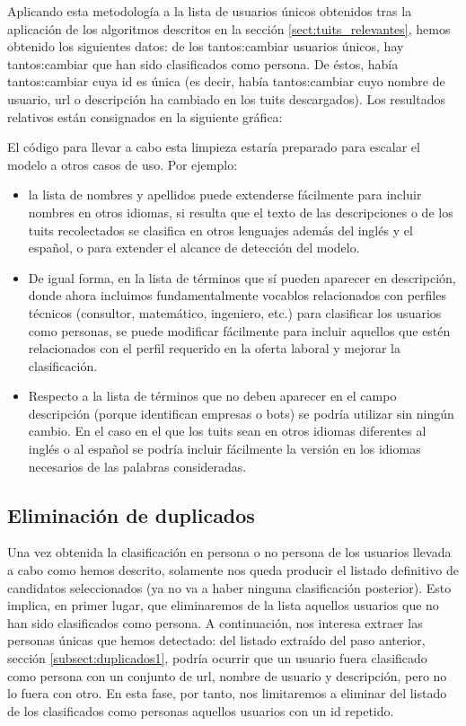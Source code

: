 Aplicando esta metodología a la lista de usuarios únicos obtenidos tras la aplicación
de los algoritmos descritos en la sección \ref{sect:tuits_relevantes}, 
hemos obtenido los siguientes datos: de los tantos:cambiar usuarios únicos, 
hay tantos:cambiar que han sido clasificados como persona. De éstos, había tantos:cambiar
cuya id es única (es decir, había tantos:cambiar cuyo nombre de usuario, url o descripción ha cambiado
en los tuits descargados). Los resultados relativos están consignados en la siguiente gráfica:


El código para llevar a cabo esta limpieza estaría preparado para escalar
el modelo a otros casos de uso. Por ejemplo:
\begin{itemize}
\item la lista de nombres y apellidos puede extenderse fácilmente para incluir nombres
en otros idiomas, si resulta que el texto de las descripciones o de los tuits recolectados
se clasifica en otros lenguajes además del inglés y el español, o para extender el alcance de
detección del modelo.
\item De igual forma, en la lista de términos que sí pueden aparecer en descripción, donde ahora
incluimos fundamentalmente vocablos relacionados con perfiles técnicos (consultor, matemático, ingeniero, etc.)
para clasificar los usuarios como personas, se puede modificar fácilmente para incluir aquellos que estén 
relacionados con el perfil requerido en la oferta laboral y mejorar la clasificación.
\item Respecto a la lista de términos que no deben aparecer en el campo descripción (porque identifican empresas 
o bots) se podría utilizar sin ningún cambio. En el caso en el que los tuits sean en otros idiomas diferentes 
al inglés o al español se podría incluir fácilmente la versión en los idiomas necesarios de las palabras 
consideradas.
\end{itemize}

\subsection{Eliminación de duplicados}
\label{subsect:duplicados2}
Una vez obtenida la clasificación en persona o no persona de los usuarios llevada a cabo como
hemos descrito, solamente nos queda producir el listado definitivo de candidatos seleccionados 
(ya no va a haber ninguna clasificación posterior). Esto implica, en primer lugar, que eliminaremos
de la lista aquellos usuarios que no han sido clasificados como persona. A continuación, nos interesa
extraer las personas únicas que hemos detectado: del listado extraído del paso anterior, 
sección \ref{subsect:duplicados1}, podría ocurrir que un usuario  fuera clasificado como persona con un
conjunto de url, nombre de usuario y descripción, pero no lo fuera con otro. En esta fase, por tanto, nos limitaremos a eliminar del listado de los clasificados como personas aquellos usuarios con un id repetido.